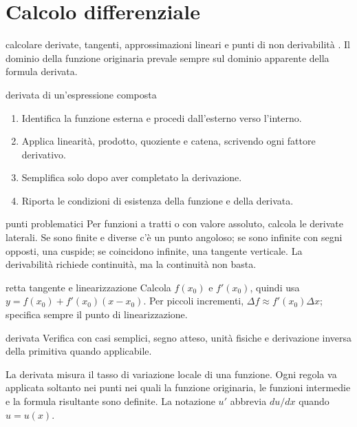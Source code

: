 \chapter{Calcolo differenziale}
\label{chap:10}

\begin{obiettivocapitolo}{calcolare derivate, tangenti, approssimazioni lineari e punti di non derivabilità}
\prioritaalta. Il dominio della funzione originaria prevale sempre sul dominio apparente della formula derivata.
\end{obiettivocapitolo}
\begin{proceduraesame}{derivata di un'espressione composta}
\begin{enumerate}
\item Identifica la funzione esterna e procedi dall'esterno verso l'interno.
\item Applica linearità, prodotto, quoziente e catena, scrivendo ogni fattore derivativo.
\item Semplifica solo dopo aver completato la derivazione.
\item Riporta le condizioni di esistenza della funzione e della derivata.
\end{enumerate}
\end{proceduraesame}
\begin{sceltametodo}{punti problematici}
Per funzioni a tratti o con valore assoluto, calcola le derivate laterali. Se sono finite e diverse c'è un punto angoloso; se sono infinite con segni opposti, una cuspide; se coincidono infinite, una tangente verticale. La derivabilità richiede continuità, ma la continuità non basta.
\end{sceltametodo}
\begin{proceduraesame}{retta tangente e linearizzazione}
Calcola $f(x_0)$ e $f'(x_0)$, quindi usa $y=f(x_0)+f'(x_0)(x-x_0)$. Per piccoli incrementi, $\Delta f\approx f'(x_0)\Delta x$; specifica sempre il punto di linearizzazione.
\end{proceduraesame}
\begin{controllofinale}{derivata}
Verifica con casi semplici, segno atteso, unità fisiche e derivazione inversa della primitiva quando applicabile.
\end{controllofinale}

La derivata misura il tasso di variazione locale di una funzione. Ogni regola va applicata soltanto nei punti nei quali la funzione originaria, le funzioni intermedie e la formula risultante sono definite. La notazione \(u'\) abbrevia \(du/dx\) quando \(u=u(x)\).

